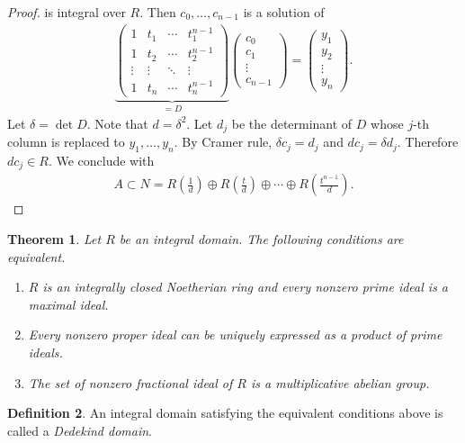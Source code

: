 \documentclass[12pt]{article}
\theoremstyle{plain}
\newtheorem{theorem}{Theorem}[section]
\theoremstyle{remark}
\theoremstyle{definition}
\newtheorem{definition}[theorem]{Definition}
\begin{document}
\begin{proof}
    is integral over $R$. Then $c_0,\dots,c_{n-1}$ is a solution of
    \begin{align*}
        \underbrace{\begin{pmatrix}
            1 & t_1 & \cdots & t_1^{n-1} \\
            1 & t_2 & \cdots & t_2^{n-1} \\
            \vdots & \vdots & \ddots & \vdots \\
            1 & t_n & \cdots & t_n^{n-1} 
        \end{pmatrix}}_{=D} \begin{pmatrix}
            c_0 \\ c_1 \\ \vdots \\ c_{n-1}
        \end{pmatrix} = \begin{pmatrix}
            y_1 \\ y_2 \\ \vdots \\ y_n
        \end{pmatrix}.
    \end{align*}
    Let $\delta = \det D$. Note that $d = \delta^2$. Let $d_j$ be the determinant of $D$ whose $j$-th column is replaced to $y_1,\dots,y_n$. By Cramer rule, $\delta c_j = d_j$ and $dc_j = \delta d_j$. Therefore $dc_j\in R$. We conclude with
    \begin{align*}
        A\subset N = R\left(\frac{1}{d}\right) \oplus R\left(\frac{t}{d}\right)\oplus \cdots\oplus R\left(\frac{t^{n-1}}{d}\right).
    \end{align*}
\end{proof}

\begin{theorem}\label{Theorem 1.3.7.}
    Let $R$ be an integral domain. The following conditions are equivalent.
    \begin{enumerate}
        \item $R$ is an integrally closed Noetherian ring and every nonzero prime ideal is a maximal ideal.
        \item Every nonzero proper ideal can be uniquely expressed as a product of prime ideals.
        \item The set of nonzero fractional ideal of $R$ is a multiplicative abelian group.
    \end{enumerate}
\end{theorem}

\begin{definition}
    An integral domain satisfying the equivalent conditions above is called a \emph{Dedekind domain}.
\end{definition}
\end{document}
